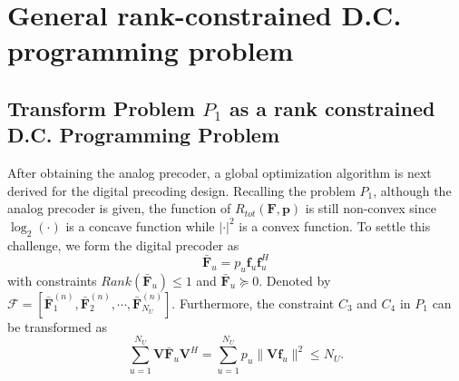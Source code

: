 \documentclass[10pt,journal,twocolumn,twoside]{IEEEtran}
\begin{document}

\section{General rank-constrained D.C. programming problem}\label{analogAndDigital}

\subsection{Transform Problem $P_1$ as a rank constrained D.C. Programming Problem}
After obtaining the analog precoder, a global optimization algorithm is next derived for the digital precoding design. 
Recalling the problem $P_1$, although the analog precoder is given, the function of $R_{tot}(\bm{F}, \bm{p})$ is still non-convex since $\log_2 (\cdot)$ is a concave function  while $|\cdot|^2$ is a convex function.  To settle this challenge, we form the digital precoder as
\begin{equation}
\bar{\bm{F}}_{u} = p_u\bm{f}_{u} \bm{f}_{u}^H
\end{equation}
with constraints $Rank(\bar{\bm{F}}_{u})\leq 1$ and $\bar{\bm{F}}_{u} \succeq 0$. Denoted by $\bm{\mathcal{F}} = [\bar{\bm{F}}^{(n)}_1, \bar{\bm{F}}^{(n)}_2,\cdots, \bar{\bm{F}}^{(n)}_{N_U}]$. Furthermore, the constraint $C_3$ and $C_4$ in $P_1$ can be transformed as 
\begin{equation}
\sum_{u=1}^{N_U}\bm{V} \bar{\bm{F}}_u\bm{V} ^H = \sum_{u=1}^{N_U} p_u\|\bm{V} \bm{f}_{u}\|^2\leq N_U.
\end{equation}
 
\end{document}

